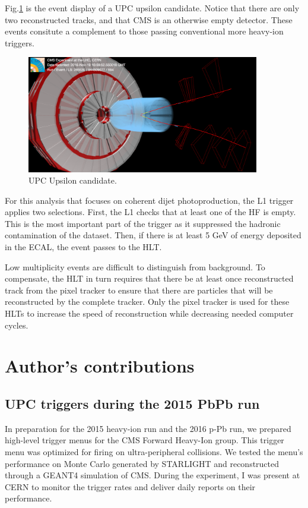 Fig.\ref{fig:eventdisplayUPCUps} is the event display of a UPC upsilon candidate. Notice that there are only two reconstructed tracks, and that CMS is an otherwise empty detector. These events consitute a complement to those passing conventional more heavy-ion triggers.

\begin{figure}[h!]
\begin{centering}
\includegraphics[width=4in]{Chapter3/importfigs/upcJpsi_run285530_lumi594_event944509077_v0.png}
\par\end{centering}
\caption{UPC Upsilon candidate. \label{fig:eventdisplayUPCUps}}
\end{figure}

For this analysis that focuses on coherent dijet photoproduction, the L1 trigger applies two selections. First, the L1 checks that at least one of the HF is empty. This is the most important part of the trigger as it suppressed the hadronic contamination of the dataset. Then, if there is at least 5 GeV of energy deposited in the ECAL, the event passes to the HLT. 

Low multiplicity events are difficult to distinguish from background. To compensate, the HLT in turn requires that there be at least once reconstructed track from the pixel tracker to ensure that there are particles that will be reconstructed by the complete tracker. Only the pixel tracker is used for these HLTs to increase the speed of reconstruction while decreasing needed computer cycles. 

\section{Author's contributions}

\subsection{UPC triggers during the 2015 PbPb run}
In preparation for the 2015 heavy-ion run and the 2016 p-Pb run, we prepared high-level trigger menus for the CMS Forward Heavy-Ion group. This trigger menu was optimized for firing on ultra-peripheral collisions. We tested the menu's performance on Monte Carlo generated by STARLIGHT \cite{starlight} and reconstructed through a GEANT4 \cite{Agostinelli:2002hh} simulation of CMS. During the experiment, I was present at CERN to monitor the trigger rates and deliver daily reports on their performance. 

